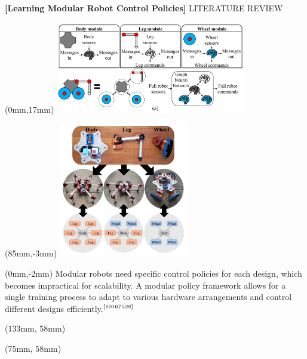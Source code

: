\documentclass[11pt,aspectratio=169]{beamer}
\begin{document}
\begin{frame}[fragile]{\fontsize{10}{10}\selectfont\textbf{[Learning Modular Robot Control Policies]} \hfill \fontsize{8}{8}\selectfont LITERATURE REVIEW \newline [2023]}
    
        \begin{textblock*}{5cm}(0mm,17mm) %
        \includegraphics[height=40mm]{elements/choset-II.png}
        \end{textblock*}

        \begin{textblock*}{5cm}(85mm,-3mm) %
        \includegraphics[height=59mm]{elements/choset.png}
        \end{textblock*}

        \begin{textblock*}{87mm}(0mm,-2mm)
        Modular robots need specific control policies for each design, which becomes impractical for scalability. A modular policy framework allows for a single training process to adapt to various hardware arrangements and control different designs efficiently.$^{\text{\cite{10167528}}}$
        \end{textblock*}

        \begin{textblock*}{5cm}(133mm, 58mm) %
        {\tiny \cite{10167528}}
        \end{textblock*}

        \begin{textblock*}{5cm}(75mm, 58mm) %
        {\tiny \cite{10167528}}
        \end{textblock*}
        
        \vspace{52mm}
\end{frame}
\end{document}
